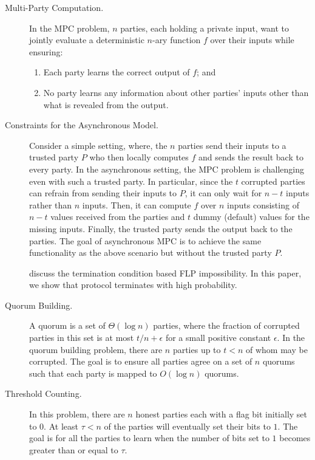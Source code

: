 \documentclass[11pt,letter]{article}
\theoremstyle{mytheoremstyle}
\begin{document}
\begin{description}
	\item[Multi-Party Computation.]
	In the MPC problem, $n$ parties, each holding a private input, want to jointly evaluate a deterministic $n$-ary function $f$ over their inputs while ensuring:
	
	\smallskip
	\begin{enumerate}
		\item Each party learns the correct output of $f$; and
		\item No party learns any information about other parties' inputs other than what is revealed from the output.
	\end{enumerate}
	
	\item[Constraints for the Asynchronous Model.]
	Consider a simple setting, where, the $n$ parties send their inputs to a trusted party $P$ who then locally computes $f$ and sends the result back to every party.
	In the asynchronous setting, the MPC problem is challenging even with such a trusted party. In particular, since the $t$ corrupted parties can refrain from sending their inputs to $P$, it can only wait for $n-t$ inputs rather than $n$ inputs. Then, it can compute $f$ over $n$ inputs consisting of $n-t$ values received from the parties and $t$ dummy (default) values for the missing inputs. Finally, the trusted party sends the output back to the parties.
	The goal of asynchronous MPC is to achieve the same functionality as the above scenario but without the trusted party $P$.
	
	discuss the termination condition based FLP impossibility. In this paper, we show that protocol terminates with high probability.  
	
	\item[Quorum Building.]
	A quorum is a set of $\Theta(\log{n})$ parties, where the fraction of corrupted parties in this set is at most $t/n+\epsilon$ for a small positive constant $\epsilon$. In the quorum building problem, there are $n$ parties up to $t < n$ of whom may be corrupted. The goal is to ensure all parties agree on a set of $n$ quorums such that each party is mapped to $O(\log{n})$ quorums.

	\item[Threshold Counting.]
	In this problem, there are $n$ honest parties each with a flag bit initially set to $0$. At least $\tau < n$ of the parties will eventually set their bits to $1$. The goal is for all the parties to learn when the number of bits set to $1$ becomes greater than or equal to $\tau$.
	
\end{description}
\end{document}
